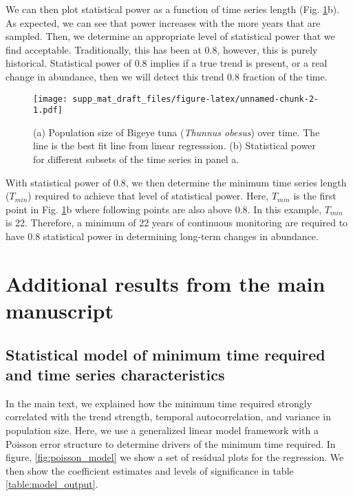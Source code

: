 \documentclass[12pt,]{article}
\begin{document}
We can then plot statistical power as a function of time series length
(Fig. \ref{fig:empirical_approach_example}b). As expected, we can see
that power increases with the more years that are sampled. Then, we
determine an appropriate level of statistical power that we find
acceptable. Traditionally, this has been at 0.8, however, this is purely
historical. Statistical power of 0.8 implies if a true trend is present,
or a real change in abundance, then we will detect this trend 0.8
fraction of the time.

\begin{figure}[htbp]
\centering
\texttt{[image: supp\_mat\_draft\_files/figure-latex/unnamed-chunk-2-1.pdf]}
\caption{(a) Population size of Bigeye tuna (\emph{Thunnus obesus}) over
time. The line is the best fit line from linear regresssion. (b)
Statistical power for different subsets of the time series in panel
a.\label{fig:empirical_approach_example}}
\end{figure}

With statistical power of 0.8, we then determine the minimum time series
length (\(T_{min}\)) required to achieve that level of statistical
power. Here, \(T_{min}\) is the first point in Fig.
\ref{fig:empirical_approach_example}b where following points are also
above 0.8. In this example, \(T_{min}\) is 22. Therefore, a minimum of
22 years of continuous monitoring are required to have 0.8 statistical
power in determining long-term changes in abundance.

\section{Additional results from the main
manuscript}\label{additional-results-from-the-main-manuscript}

\subsection{Statistical model of minimum time required and time series
characteristics}\label{statistical-model-of-minimum-time-required-and-time-series-characteristics}

In the main text, we explained how the minimum time required strongly
correlated with the trend strength, temporal autocorrelation, and
variance in population size. Here, we use a generalized linear model
framework with a Poisson error structure to determine drivers of the
minimum time required. In figure, \ref{fig:poisson_model} we show a set
of residual plots for the regression. We then show the coefficient
estimates and levels of significance in table \ref{table:model_output}.
\end{document}

